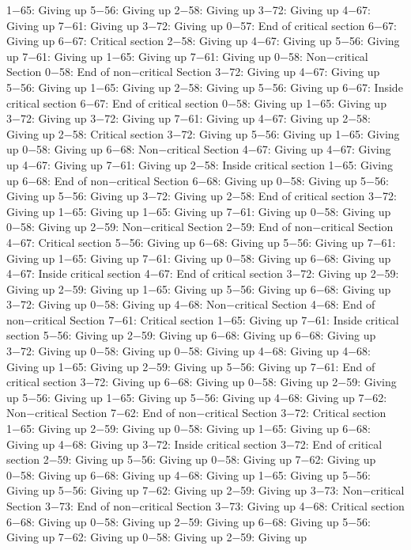 1−65: Giving up
5−56: Giving up
2−58: Giving up
3−72: Giving up
4−67: Giving up
7−61: Giving up
3−72: Giving up
0−57: End of critical section
6−67: Giving up
6−67: Critical section
2−58: Giving up
4−67: Giving up
5−56: Giving up
7−61: Giving up
1−65: Giving up
7−61: Giving up
0−58: Non−critical Section
0−58: End of non−critical Section
3−72: Giving up
4−67: Giving up
5−56: Giving up
1−65: Giving up
2−58: Giving up
5−56: Giving up
6−67: Inside critical section
6−67: End of critical section
0−58: Giving up
1−65: Giving up
3−72: Giving up
3−72: Giving up
7−61: Giving up
4−67: Giving up
2−58: Giving up
2−58: Critical section
3−72: Giving up
5−56: Giving up
1−65: Giving up
0−58: Giving up
6−68: Non−critical Section
4−67: Giving up
4−67: Giving up
4−67: Giving up
7−61: Giving up
2−58: Inside critical section
1−65: Giving up
6−68: End of non−critical Section
6−68: Giving up
0−58: Giving up
5−56: Giving up
5−56: Giving up
3−72: Giving up
2−58: End of critical section
3−72: Giving up
1−65: Giving up
1−65: Giving up
7−61: Giving up
0−58: Giving up
0−58: Giving up
2−59: Non−critical Section
2−59: End of non−critical Section
4−67: Critical section
5−56: Giving up
6−68: Giving up
5−56: Giving up
7−61: Giving up
1−65: Giving up
7−61: Giving up
0−58: Giving up
6−68: Giving up
4−67: Inside critical section
4−67: End of critical section
3−72: Giving up
2−59: Giving up
2−59: Giving up
1−65: Giving up
5−56: Giving up
6−68: Giving up
3−72: Giving up
0−58: Giving up
4−68: Non−critical Section
4−68: End of non−critical Section
7−61: Critical section
1−65: Giving up
7−61: Inside critical section
5−56: Giving up
2−59: Giving up
6−68: Giving up
6−68: Giving up
3−72: Giving up
0−58: Giving up
0−58: Giving up
4−68: Giving up
4−68: Giving up
1−65: Giving up
2−59: Giving up
5−56: Giving up
7−61: End of critical section
3−72: Giving up
6−68: Giving up
0−58: Giving up
2−59: Giving up
5−56: Giving up
1−65: Giving up
5−56: Giving up
4−68: Giving up
7−62: Non−critical Section
7−62: End of non−critical Section
3−72: Critical section
1−65: Giving up
2−59: Giving up
0−58: Giving up
1−65: Giving up
6−68: Giving up
4−68: Giving up
3−72: Inside critical section
3−72: End of critical section
2−59: Giving up
5−56: Giving up
0−58: Giving up
7−62: Giving up
0−58: Giving up
6−68: Giving up
4−68: Giving up
1−65: Giving up
5−56: Giving up
5−56: Giving up
7−62: Giving up
2−59: Giving up
3−73: Non−critical Section
3−73: End of non−critical Section
3−73: Giving up
4−68: Critical section
6−68: Giving up
0−58: Giving up
2−59: Giving up
6−68: Giving up
5−56: Giving up
7−62: Giving up
0−58: Giving up
2−59: Giving up
